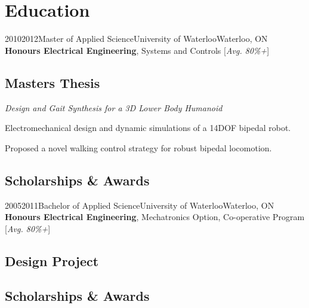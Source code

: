 \section{Education}

\vspace{2 mm}
\tlcventry
{2010}{2012}{Master of Applied Science}{University of Waterloo}{Waterloo, ON}{}
{\textbf{Honours Electrical Engineering}, Systems and Controls [\emph{Avg. 80\%+}]}

\subsection{Masters Thesis} %
	{\emph{Design and Gait Synthesis for a 3D Lower Body Humanoid}
	\begin{tightitemize}
		\item Electromechanical design and dynamic simulations of a 14DOF bipedal robot.
		\item Proposed a novel walking control strategy for robust bipedal locomotion.
	\end{tightitemize}}
	\vspace{-6 mm}

\subsection{Scholarships \& Awards} %

\vspace{5 mm}
\tlcventry
{2005}{2011}{Bachelor of Applied Science}{University of Waterloo}{Waterloo, ON}{}
{\textbf{Honours Electrical Engineering}, Mechatronics Option, Co-operative Program
 [\emph{Avg. 80\%+}]}

\subsection{Design Project} %
	\vspace{-6 mm}
\subsection{Scholarships \& Awards} %
\vspace{2 mm}
